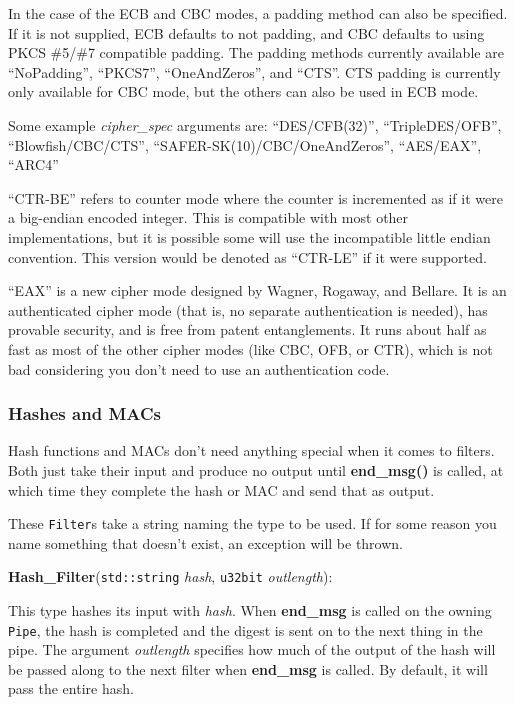 \documentclass{article}
\newcommand{\function}[1]{\textbf{#1}}
\newcommand{\type}[1]{\texttt{#1}}
\renewcommand{\arg}[1]{\textsl{#1}}
\begin{document}
In the case of the ECB and CBC modes, a padding method can also be
specified. If it is not supplied, ECB defaults to not padding, and CBC defaults
to using PKCS \#5/\#7 compatible padding. The padding methods currently
available are ``NoPadding'', ``PKCS7'', ``OneAndZeros'', and ``CTS''. CTS
padding is currently only available for CBC mode, but the others can also be
used in ECB mode.

Some example \arg{cipher\_spec} arguments are: ``DES/CFB(32)'',
``TripleDES/OFB'', ``Blowfish/CBC/CTS'', ``SAFER-SK(10)/CBC/OneAndZeros'',
``AES/EAX'', ``ARC4''

``CTR-BE'' refers to counter mode where the counter is incremented as if it
were a big-endian encoded integer. This is compatible with most other
implementations, but it is possible some will use the incompatible little
endian convention. This version would be denoted as ``CTR-LE'' if it were
supported.

``EAX'' is a new cipher mode designed by Wagner, Rogaway, and Bellare. It is an
authenticated cipher mode (that is, no separate authentication is needed), has
provable security, and is free from patent entanglements. It runs about half as
fast as most of the other cipher modes (like CBC, OFB, or CTR), which is not
bad considering you don't need to use an authentication code.

\subsubsection{Hashes and MACs}

Hash functions and MACs don't need anything special when it comes to
filters. Both just take their input and produce no output until
\function{end\_msg()} is called, at which time they complete the hash or MAC
and send that as output.

These \type{Filter}s take a string naming the type to be used. If for some
reason you name something that doesn't exist, an exception will be thrown.

\noindent
\function{Hash\_Filter}(\type{std::string} \arg{hash},
                        \type{u32bit} \arg{outlength}):

This type hashes its input with \arg{hash}. When \function{end\_msg} is called
on the owning \type{Pipe}, the hash is completed and the digest is sent on to
the next thing in the pipe. The argument \arg{outlength} specifies how much of
the output of the hash will be passed along to the next filter when
\function{end\_msg} is called. By default, it will pass the entire hash.
\end{document}
